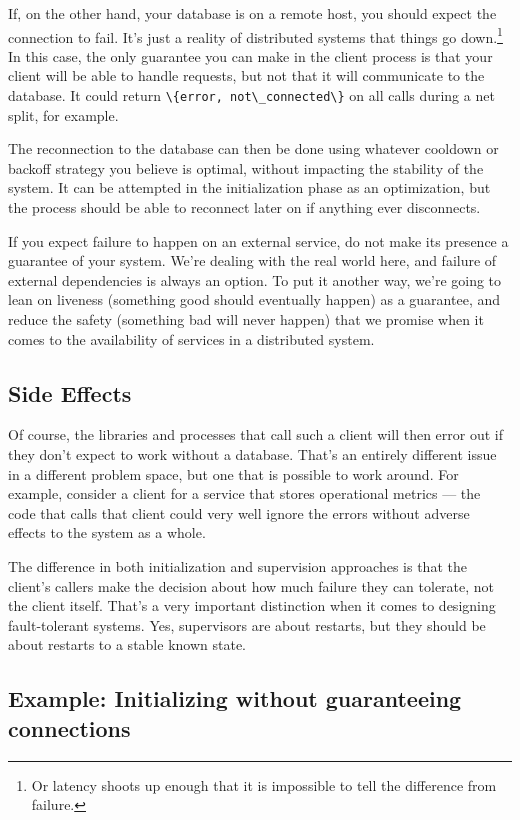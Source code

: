 \documentclass[11pt, oneside]{book}   	%
\newcommand{\expression}[1]{\Verb`#1`}
\begin{document}
If, on the other hand, your database is on a remote host, you should expect the connection to fail. It's just a reality of distributed systems that things go down.\footnote{Or latency shoots up enough that it is impossible to tell the difference from failure.} In this case, the only guarantee you can make in the client process is that your client will be able to handle requests, but not that it will communicate to the database. It could return \expression{\{error, not\_connected\}} on all calls during a net split, for example.

The reconnection to the database can then be done using whatever cooldown or backoff strategy you believe is optimal, without impacting the stability of the system. It can be attempted in the initialization phase as an optimization, but the process should be able to reconnect later on if anything ever disconnects.

If you expect failure to happen on an external service, do not make its presence a guarantee of your system. We're dealing with the real world here, and failure of external dependencies is always an option. To put it another way, we're going to lean on liveness (something good should eventually happen) as a guarantee, and reduce the safety (something bad will never happen) that we promise when it comes to the availability of services in a distributed system.

\subsection{Side Effects}
\label{subsec:start-link-side-effects}

Of course, the libraries and processes that call such a client will then error out if they don't expect to work without a database. That's an entirely different issue in a different problem space, but one that is possible to work around. For example, consider a client for a service that stores operational metrics — the code that calls that client could very well ignore the errors without adverse effects to the system as a whole. 

The difference in both initialization and supervision approaches is that the client's callers make the decision about how much failure they can tolerate, not the client itself. That's a very important distinction when it comes to designing fault-tolerant systems. Yes, supervisors are about restarts, but they should be about restarts to a stable known state.

\subsection{Example: Initializing without guaranteeing connections}
\label{subsec:start-link-initializing-without-guaranteeing-connections}
\end{document}
